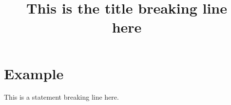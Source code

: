 \documentclass[a4paper,11pt,oneside,openany,report]{jsbook}
\title{This is the title breaking line\\here}
\begin{document}
\maketitle
\chapter{Example}\label{ch:Example}
This is a statement breaking line
here.
\end{document}
